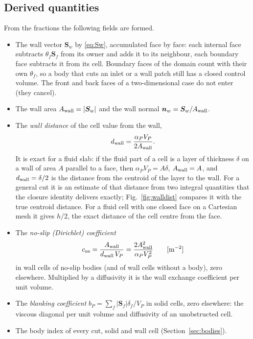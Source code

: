\documentclass[11pt,a4paper]{article}
\theoremstyle{remark}
\newcommand{\nn}{\bm{n}}
\newcommand{\Sf}{\bm{S}_f}
\newcommand{\Sw}{\bm{S}_w}
\newcommand{\Aw}{A_{\rm wall}}
\newcommand{\dw}{d_{\rm wall}}
\newcommand{\cns}{c_{\rm ns}}
\begin{document}
\subsection{Derived quantities}
\label{sec:derived}

From the fractions the following fields are formed.
\begin{itemize}\itemsep3pt
\item The wall vector $\Sw$ by \eqref{eq:Sw}, accumulated face by face: each internal face
      subtracts $\theta_f\Sf$ from its owner and adds it to its neighbour, each boundary face
      subtracts it from its cell. Boundary faces of the domain count with their own
      $\theta_f$, so a body that cuts an inlet or a wall patch still has a closed control
      volume. The front and back faces of a two-dimensional case do not enter (they cancel).
\item The wall area $\Aw=|\Sw|$ and the wall normal $\nn_w=\Sw/\Aw$.
\item The \emph{wall distance} of the cell value from the wall,
      \begin{equation}
      \dw=\frac{\alpha_PV_P}{2\Aw}.
      \label{eq:dwall}
      \end{equation}
      It is exact for a fluid slab: if the fluid part of a cell is a layer of thickness
      $\delta$ on a wall of area $A$ parallel to a face, then $\alpha_PV_P=A\delta$,
      $\Aw=A$, and $\dw=\delta/2$ is the distance from the centroid of the layer to the wall.
      For a general cut it is an estimate of that distance from two integral quantities that
      the closure identity delivers exactly; Fig.~\ref{fig:walldist} compares it with the
      true centroid distance. For a fluid cell with one closed face on a Cartesian mesh it
      gives $h/2$, the exact distance of the cell centre from the face.
\item The \emph{no-slip (Dirichlet) coefficient}
      \begin{equation}
      \cns=\frac{\Aw}{\dw\,V_P}=\frac{2\Aw^2}{\alpha_PV_P^2}\qquad[\mathrm{m}^{-2}]
      \label{eq:cns}
      \end{equation}
      in wall cells of no-slip bodies (and of wall cells without a body), zero elsewhere.
      Multiplied by a diffusivity it is the wall exchange coefficient per unit volume.
\item The \emph{blanking coefficient} $b_P=\sum_f|\Sf|\delta_f/V_P$ in solid cells, zero
      elsewhere: the viscous diagonal per unit volume and diffusivity of an unobstructed cell.
\item The body index of every cut, solid and wall cell (Section~\ref{sec:bodies}).
\end{itemize}
\end{document}

